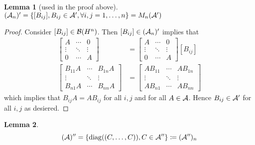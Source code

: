 \documentclass[10pt,english,a4paper]{article}
\theoremstyle{definition}
\newtheorem*{lemma}{Lemma}
\DeclareMathOperator{\diag}{diag}
\begin{document}
\begin{lemma}[used in the proof above]
    $(\mathcal{A}_n)' = \{[B_{ij}], B_{ij} \in \mathcal{A}', \forall i,j = 1,\ldots,n\} = M_n(\mathcal{A}')$
\end{lemma}
\begin{proof}
    Consider $[B_{ij}] \in \mathcal{B}(H^n)$. 
Then $[B_{ij}] \in (\mathcal{A}_n)'$ implies that 
\begin{align*}
    [B_{ij}]
\begin{bmatrix} A &\cdots & 0 \\ \vdots &\ddots &\vdots\\ 0 &\cdots &A \end{bmatrix}
&= 
\begin{bmatrix} A &\cdots & 0 \\ \vdots &\ddots &\vdots\\ 0 &\cdots &A \end{bmatrix}
[B_{ij}] \\
\begin{bmatrix} B_{11}A &\cdots & B_{1n}A \\ \vdots &\ddots &\vdots\\ B_{n1}A &\cdots &B_{nn}A \end{bmatrix}
&= 
\begin{bmatrix} AB_{11} &\cdots & AB_{1n} \\ \vdots &\ddots &\vdots\\ AB_{n1} &\cdots &AB_{nn} \end{bmatrix}
\end{align*}
which implies that 
$B_{ij}A = AB_{ij}$ for all $i,j$ and for all $A \in \mathcal{A}$. Hence
$B_{ij} \in \mathcal{A}'$ for all $i,j$ as desiered. 
\end{proof}

\begin{lemma}
    \[(\As)'' = \left\{\diag((C,\ldots, C)), C \in \As''\right\} \coloneqq (\As'')_n\]
\end{lemma}
\end{document}
